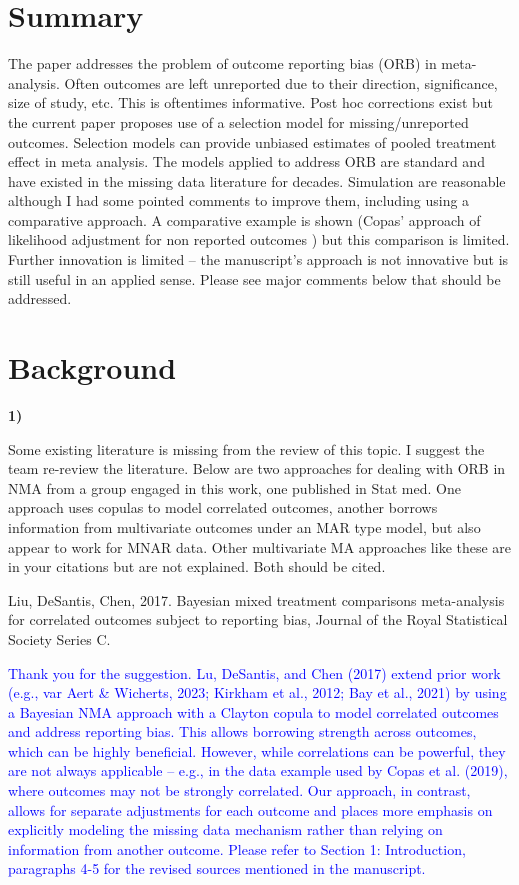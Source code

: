 \documentclass{article}
\begin{document}
\section*{Summary}

The paper addresses the problem of outcome reporting bias (ORB) in meta-analysis. Often outcomes are left unreported due to their direction, significance, size of study, etc. This is oftentimes informative. Post hoc corrections exist but the current paper proposes use of a selection model for missing/unreported outcomes. Selection models can provide unbiased estimates of pooled treatment effect in meta analysis. The models applied to address ORB are standard and have existed in the missing data literature for decades. Simulation are reasonable although I had some pointed comments to improve them, including using a comparative approach. A comparative example is shown (Copas’ approach of likelihood adjustment for non reported outcomes ) but this comparison is limited. Further innovation is limited – the manuscript’s approach is not innovative but is still useful in an applied sense. Please see major comments below that should be addressed. 

\section*{Background}

\textbf{1)}

\bigskip

Some existing literature is missing from the review of this topic. I suggest the team re-review the literature. Below are two approaches for dealing with ORB in NMA from a group engaged in this work, one published in Stat med. One approach uses copulas to model correlated outcomes, another borrows information from multivariate outcomes under an MAR type model, but also appear to work for MNAR data. Other multivariate MA approaches like these are in your citations but are not explained. Both should be cited. 

\bigskip

Liu, DeSantis, Chen, 2017. Bayesian mixed treatment comparisons meta-analysis for correlated outcomes subject to reporting bias, Journal of the Royal Statistical Society Series C. 

\bigskip

\textcolor{blue}{Thank you for the suggestion. Lu, DeSantis, and Chen (2017) extend prior work (e.g., var Aert \& Wicherts, 2023; Kirkham et al., 2012; Bay et al., 2021) by using a Bayesian NMA approach with a Clayton copula to model correlated outcomes and address reporting bias. This allows borrowing strength across outcomes, which can be highly beneficial. However, while correlations can be powerful, they are not always applicable – e.g., in the data example used by Copas et al. (2019), where outcomes may not be strongly correlated. Our approach, in contrast, allows for separate adjustments for each outcome and places more emphasis on explicitly modeling the missing data mechanism rather than relying on information from another outcome. Please refer to Section 1: Introduction, paragraphs 4-5 for the revised sources mentioned in the manuscript.}
\end{document}

